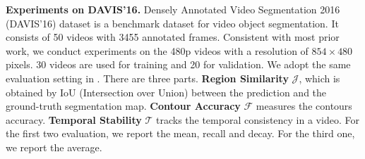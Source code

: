 \documentclass{bmvc2k}
\begin{document}
\textbf{Experiments on DAVIS'16.}
Densely Annotated Video Segmentation 2016 (DAVIS'16) dataset is a benchmark dataset for video object segmentation. It consists of 50 videos with 3455 annotated frames. Consistent with most prior work, we conduct experiments on the 480p videos with a resolution of $854 \times 480$ pixels. 30 videos are used for training and 20 for validation.
We adopt the same evaluation setting in \cite{Perazzi2016}. There are three parts. \textbf{Region Similarity} $\mathcal{J}$, which is obtained by IoU (Intersection over Union) between the prediction and the ground-truth segmentation map. \textbf{Contour Accuracy} $\mathcal{F}$ measures the contours accuracy. \textbf{Temporal Stability} $\mathcal{T}$ tracks the temporal consistency in a video. For the first two evaluation, we report the mean, recall and decay. For the third one, we report the average.
\end{document}
